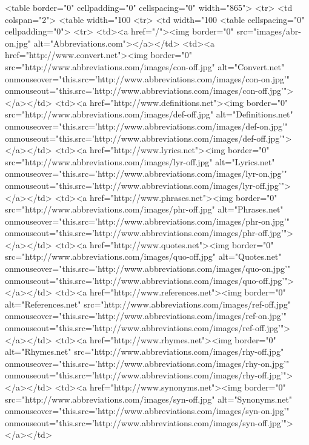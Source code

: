 {<table border="0" cellpadding="0" cellspacing="0" width="865">
	<tr>
		<td colspan="2">
			<table width="100%
				<tr>
					<td width="100%
						<table cellspacing="0" cellpadding="0">
							<tr>
								<td><a href="/"><img border="0" src="images/abr-on.jpg" alt="Abbreviations.com"></a></td>
								<td><a href="http://www.convert.net"><img border="0" src="http://www.abbreviations.com/images/con-off.jpg" alt="Convert.net" onmouseover="this.src='http://www.abbreviations.com/images/con-on.jpg'" onmouseout="this.src='http://www.abbreviations.com/images/con-off.jpg'"></a></td>
								<td><a href="http://www.definitions.net"><img border="0" src="http://www.abbreviations.com/images/def-off.jpg" alt="Definitions.net" onmouseover="this.src='http://www.abbreviations.com/images/def-on.jpg'" onmouseout="this.src='http://www.abbreviations.com/images/def-off.jpg'"></a></td>
								<td><a href="http://www.lyrics.net"><img border="0" src="http://www.abbreviations.com/images/lyr-off.jpg" alt="Lyrics.net" onmouseover="this.src='http://www.abbreviations.com/images/lyr-on.jpg'" onmouseout="this.src='http://www.abbreviations.com/images/lyr-off.jpg'"></a></td>
								<td><a href="http://www.phrases.net"><img border="0" src="http://www.abbreviations.com/images/phr-off.jpg" alt="Phrases.net" onmouseover="this.src='http://www.abbreviations.com/images/phr-on.jpg'" onmouseout="this.src='http://www.abbreviations.com/images/phr-off.jpg'"></a></td>
								<td><a href="http://www.quotes.net"><img border="0" src="http://www.abbreviations.com/images/quo-off.jpg" alt="Quotes.net" onmouseover="this.src='http://www.abbreviations.com/images/quo-on.jpg'" onmouseout="this.src='http://www.abbreviations.com/images/quo-off.jpg'"></a></td>
								<td><a href="http://www.references.net"><img border="0" alt="References.net" src="http://www.abbreviations.com/images/ref-off.jpg"  onmouseover="this.src='http://www.abbreviations.com/images/ref-on.jpg'" onmouseout="this.src='http://www.abbreviations.com/images/ref-off.jpg'"></a></td>
								<td><a href="http://www.rhymes.net"><img border="0" alt="Rhymes.net" src="http://www.abbreviations.com/images/rhy-off.jpg" onmouseover="this.src='http://www.abbreviations.com/images/rhy-on.jpg'" onmouseout="this.src='http://www.abbreviations.com/images/rhy-off.jpg'"></a></td>
								<td><a href="http://www.synonyms.net"><img border="0" src="http://www.abbreviations.com/images/syn-off.jpg" alt="Synonyms.net" onmouseover="this.src='http://www.abbreviations.com/images/syn-on.jpg'" onmouseout="this.src='http://www.abbreviations.com/images/syn-off.jpg'"></a></td>
}
